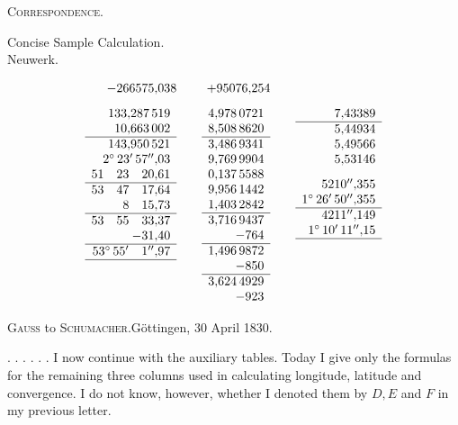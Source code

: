 \par\clearpage
{}\hfill\textsc{Correspondence.}\hfill\mbox{}\par\medskip
\begin{center}Concise Sample Calculation.\\Neuwerk.\end{center}
\[
\begin{array}{r@{\qquad}r@{\qquad}r}
-266575{,}038&+95076{,}254&\\[8pt]
\begin{array}[t]{r}
133{,}287\,519\\10{,}663\,002\\\hline
143{,}950\,521\\2^\circ\,23'\,57''{,}03\\51\quad23\quad20{,}61\\\hline
53\quad47\quad17{,}64\\8\quad15{,}73\\\hline
53\quad55\quad33{,}37\\-31{,}40\\\hline
53^\circ\,55'\quad1''{,}97\\\hline
\end{array}&
\begin{array}[t]{r}
4{,}978\,0721\\8{,}508\,8620\\\hline
3{,}486\,9341\\9{,}769\,9904\\0{,}137\,5588\\9{,}956\,1442\\1{,}403\,2842\\\hline
3{,}716\,9437\\-764\\\hline
1{,}496\,9872\\-850\\\hline
3{,}624\,4929\\-923
\end{array}&
\begin{array}[t]{r}
7{,}43389\\\hline5{,}44934\\5{,}49566\\5{,}53146\\[8pt]
5210''{,}355\\1^\circ\,26'\,50''{,}355\\\hline
4211''{,}149\\1^\circ\,10'\,11''{,}15\\\hline
\end{array}
\end{array}
\]
\bigskip
\begin{center}\textsc{Gauss} to \textsc{Schumacher}.\quad Göttingen, 30 April 1830.\end{center}
. . . . . . I now continue with the auxiliary tables. Today I give only the formulas for the remaining three columns used in calculating longitude, latitude and convergence. I do not know, however, whether I denoted them by \(D,E\) and \(F\) in my previous letter.

